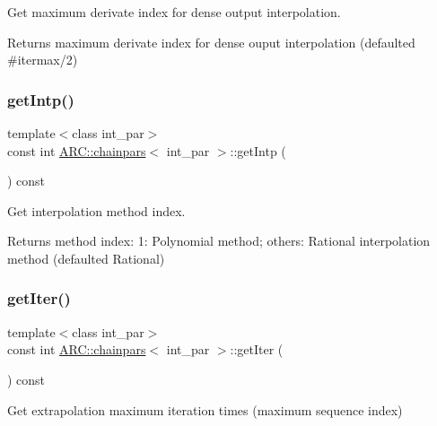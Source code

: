 Get maximum derivate index for dense output interpolation. 

\begin{DoxyReturn}{Returns}
maximum derivate index for dense ouput interpolation (defaulted \#itermax/2) 
\end{DoxyReturn}
\hypertarget{classARC_1_1chainpars_a1b8acf4c95dcb454d5c3f6aaaeb1b358}{}\label{classARC_1_1chainpars_a1b8acf4c95dcb454d5c3f6aaaeb1b358} 
\subsubsection{\texorpdfstring{get\+Intp()}{getIntp()}}
{\footnotesize\ttfamily template$<$class int\+\_\+par$>$ \\
const int \hyperlink{classARC_1_1chainpars}{A\+R\+C\+::chainpars}$<$ int\+\_\+par $>$\+::get\+Intp (\begin{DoxyParamCaption}{ }\end{DoxyParamCaption}) const\hspace{0.3cm}{\ttfamily [inline]}}



Get interpolation method index. 

\begin{DoxyReturn}{Returns}
method index\+: 1\+: Polynomial method; others\+: Rational interpolation method (defaulted Rational) 
\end{DoxyReturn}
\hypertarget{classARC_1_1chainpars_a12c79f1a146b4744460f3a21805cccd4}{}\label{classARC_1_1chainpars_a12c79f1a146b4744460f3a21805cccd4} 
\subsubsection{\texorpdfstring{get\+Iter()}{getIter()}}
{\footnotesize\ttfamily template$<$class int\+\_\+par$>$ \\
const int \hyperlink{classARC_1_1chainpars}{A\+R\+C\+::chainpars}$<$ int\+\_\+par $>$\+::get\+Iter (\begin{DoxyParamCaption}{ }\end{DoxyParamCaption}) const\hspace{0.3cm}{\ttfamily [inline]}}



Get extrapolation maximum iteration times (maximum sequence index) 

